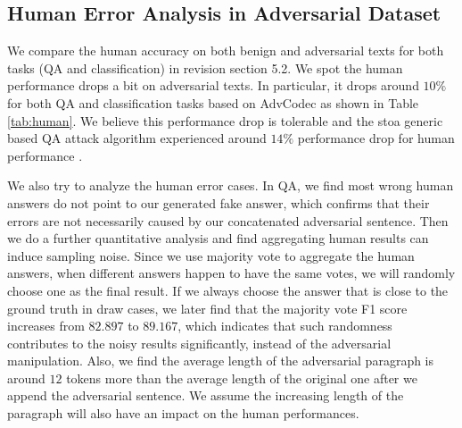\subsection{Human Error Analysis in Adversarial Dataset}
\label{appendix:humanerror}
We compare the human accuracy on both benign and adversarial texts for both tasks (QA and classification) in revision section 5.2. We spot the human performance drops a bit on adversarial texts. In particular, it drops around $10\%$ for both QA and classification tasks based on AdvCodec as shown in Table \ref{tab:human}. We believe this performance drop is tolerable and the stoa generic based QA attack algorithm experienced around $14\%$ performance drop for human performance \citep{jia-liang-2017-adversarial}.

We also try to analyze the human error cases. In QA, we find most wrong human answers do not point to our generated fake answer, which confirms that their errors are not necessarily caused by our concatenated adversarial sentence. Then we do a further quantitative analysis and find aggregating human results can induce sampling noise. Since we use majority vote to aggregate the human answers, when different answers happen to have the same votes, we will randomly choose one as the final result. If we always choose the answer that is close to the ground truth in draw cases, we later find that the majority vote F1 score increases from $82.897$ to $89.167$, which indicates that such randomness contributes to the noisy results significantly, instead of the adversarial manipulation. Also, we find the average length of the adversarial paragraph is around $12$ tokens more than the average length of the original one after we append the adversarial sentence. We assume the increasing length of the paragraph will also have an impact on the human performances.
 
 

